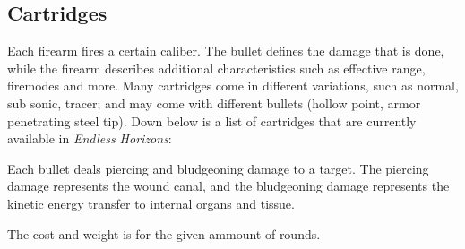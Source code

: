 \subsection{Cartridges}

Each firearm fires a certain caliber. The bullet defines the damage that is
done, while the firearm describes additional characteristics such as effective
range, firemodes and more. Many cartridges come in different variations, such as
normal, sub sonic, tracer; and may come with different bullets (hollow point,
armor penetrating steel tip). Down below is a list of cartridges that are
currently available in \emph{Endless Horizons}:

Each bullet deals piercing and bludgeoning damage to a target. The piercing
damage represents the wound canal, and the bludgeoning damage represents the
kinetic energy transfer to internal organs and tissue.

The cost and weight is for the given ammount of rounds.

